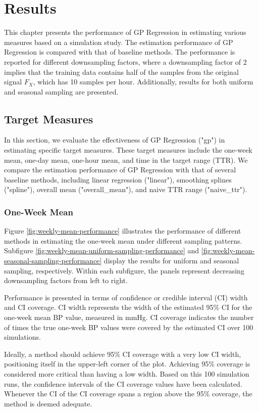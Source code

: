 \chapter{Results}\label{ch:results}

This chapter presents the performance of GP Regression in estimating various
measures based on a simulation study.
The estimation performance of GP Regression is compared with that of baseline methods.
The performance is reported for different downsampling factors, where a downsampling
factor of 2 implies that the training data contains half of the samples from the
original signal $F_X$, which has 10 samples per hour.
Additionally, results for both uniform and seasonal sampling are presented.

\section{Target Measures}

In this section, we evaluate the effectiveness of GP Regression ("gp") in
estimating specific target measures. These target measures include the one-week mean,
one-day mean, one-hour mean, and time in the target range (TTR).
We compare the estimation performance of GP Regression with that of several baseline methods,
including linear regression ("linear"), smoothing splines ("spline"), overall mean
("overall\_mean"), and naive TTR range ("naive\_ttr").

\subsection{One-Week Mean}

Figure \ref{fig:weekly-mean-performance} illustrates the performance of different
methods in estimating the one-week mean under different sampling patterns.
Subfigure \ref{fig:weekly-mean-uniform-sampling-performance} and
\ref{fig:weekly-mean-seasonal-sampling-performance} display the results
for uniform and seasonal sampling, respectively. Within each subfigure, the panels
represent decreasing downsampling factors from left to right.

Performance is presented in terms of confidence or credible interval (CI) width and CI coverage.
CI width represents the width of the estimated 95\% CI for the one-week mean BP value,
measured in mmHg. CI coverage indicates the number of times the true one-week BP
values were covered by the estimated CI over 100 simulations.

Ideally, a method should achieve 95\% CI coverage with a very low CI width,
positioning itself in the upper-left corner of the plot. Achieving 95\% coverage
is considered more critical than having a low width.
Based on this 100 simulation runs, the confidence intervals
of the CI coverage values have been calculated.
Whenever the CI of the CI coverage
spans a region above the 95\% coverage, the method is deemed adequate.

